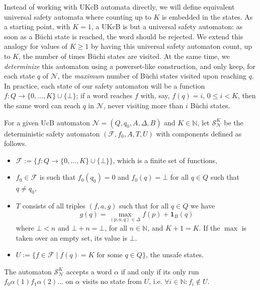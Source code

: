 \documentclass[runningheads,a4paper,draft]{llncs}
\newcommand{\indicator}[2]{\mathbf{1}_{#1}(#2)}
\newcommand{\calF}{\mathcal{F}}
\newcommand{\calN}{\mathcal{N}}
\newcommand{\calS}{\mathcal{S}}
\begin{document}
Instead of working with UKcB automata directly, we will define equivalent
universal safety automata where counting up to \(K\) is embedded in the states.
As a starting point, with \(K = 1\), a UKcB is but a universal safety automaton:
as soon as a B\"uchi state is reached, the word should be
rejected. We extend this analogy for values
of \(K \geq 1\) by having this universal safety automaton count, up to \(K\), the
number of times B\"uchi states are visited.  At the same time, we
\emph{determinize} this automaton using a powerset-like construction, and only
keep, for each state \(q\) of \(\calN\), the \emph{maximum} number of B\"uchi
states visited upon reaching \(q\).  In practice, each state of our
safety automaton will be a function
\(f\colon Q \to \{0, \dots, K\} \cup \{\bot\}\); if a word reaches \(f\) with, say,
\(f(q) = i\), \(0 \leq i < K \), then the same word can reach \(q\) in
\(\calN\), never visiting more than \(i\) B\"uchi states.
\begin{definition}
  For a given UcB automaton $\calN = (Q,q_0,A,\Delta,B)$ and $K \in \mathbb{N}$,
  let $\calS^K_\calN$ be the deterministic safety
  automaton $(\calF,f_0,A,T,U)$ with components defined as follows.
  \begin{itemize}
    \item $\calF := \{f \colon Q \to \{0,\dots,K\} \cup
      \{\bot\}\}$, which is a finite set of functions,
    \item $f_0 \in \calF$ is such that $f_0(q_0) = 0$ and $f_0(q) =
      \bot$ for all $q \in Q$ such that $q \neq q_0$,
    \item $T$ consists of all triples $(f,a,g)$ such that for all $q \in Q$ we
      have
      \[
        g(q) = \max_{(p,a,q) \in \Delta}
        f(p) + \indicator{B}{q}
      \]
      where $\bot < n$ and $\bot + n = \bot$, for all $n \in \mathbb{N}$, and
      $K + 1 = K$.  If the \(\max\) is taken over an empty set, its value is \(\bot\).
    \item $U := \{ f \in \calF \mid f(q) = K \text{ for
      some } q \in Q \}$, the unsafe states.
  \end{itemize}
  The automaton $\calS^K_\calN$ accepts a word $\alpha$ if and only if its only
  run $f_0 \alpha(1) f_1 \alpha(2) \dots$ on $\alpha$ visits no state from $U$,
  i.e. $\forall i \in \mathbb{N} : f_i \not\in U$.
\end{definition}
\end{document}

